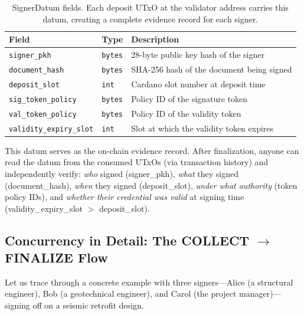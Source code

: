 \begin{table}[H]
\centering
\small
\begin{tabular}{@{}llp{6.5cm}@{}}
\toprule
\textbf{Field} & \textbf{Type} & \textbf{Description} \\
\midrule
\texttt{signer\_pkh} & \texttt{bytes} & 28-byte public key hash of the signer \\
\texttt{document\_hash} & \texttt{bytes} & SHA-256 hash of the document being signed \\
\texttt{deposit\_slot} & \texttt{int} & Cardano slot number at deposit time \\
\texttt{sig\_token\_policy} & \texttt{bytes} & Policy ID of the signature token \\
\texttt{val\_token\_policy} & \texttt{bytes} & Policy ID of the validity token \\
\texttt{validity\_expiry\_slot} & \texttt{int} & Slot at which the validity token expires \\
\bottomrule
\end{tabular}
\caption{SignerDatum fields. Each deposit UTxO at the validator address carries this datum, creating a complete evidence record for each signer.}
\label{tab:signer-datum}
\end{table}

This datum serves as the on-chain evidence record. After finalization,
anyone can read the datum from the consumed UTxOs (via transaction
history) and independently verify: \emph{who} signed (signer\_pkh),
\emph{what} they signed (document\_hash), \emph{when} they signed
(deposit\_slot), \emph{under what authority} (token policy IDs), and
\emph{whether their credential was valid} at signing time
(validity\_expiry\_slot $>$ deposit\_slot).

\subsection{Concurrency in Detail: The COLLECT $\rightarrow$ FINALIZE Flow}

Let us trace through a concrete example with three signers---Alice
(a structural engineer), Bob (a geotechnical engineer), and Carol
(the project manager)---signing off on a seismic retrofit design.

